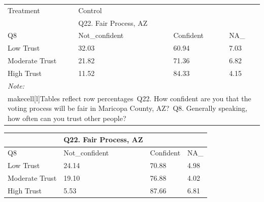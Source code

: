\documentclass[
  11pt,
  a4paper,
]{article}
\begin{document}
\begin{table}
\centering
\centering
\begin{tabular}[t]{l|l|l|l}
\hline
\multicolumn{1}{l|}{Treatment} & \multicolumn{1}{l}{Control} \\
\cline{1-1} \cline{2-2}
 & Q22. Fair Process, AZ &  & \\
\hline
Q8 & Not\_confident & Confident & NA\_\\
\hline
Low Trust & 32.03 & 60.94 & 7.03\\
\hline
Moderate Trust & 21.82 & 71.36 & 6.82\\
\hline
High Trust & 11.52 & 84.33 & 4.15\\
\hline
\multicolumn{4}{l}{\rule{0pt}{1em}\textit{Note: }}\\
\multicolumn{4}{l}{\rule{0pt}{1em}makecell[l]{Tables reflect row percentages\ Q22. How confident are you that the voting process will be fair in Maricopa County, AZ?\ Q8. Generally speaking, how often can you trust other people?}}\\
\end{tabular}
\centering
\begin{tabular}[t]{l|l|l|l}
\hline
 & Q22. Fair Process, AZ &  & \\
\hline
Q8 & Not\_confident & Confident & NA\_\\
\hline
Low Trust & 24.14 & 70.88 & 4.98\\
\hline
Moderate Trust & 19.10 & 76.88 & 4.02\\
\hline
High Trust & 5.53 & 87.66 & 6.81\\
\hline
\end{tabular}
\end{table}
\end{document}
